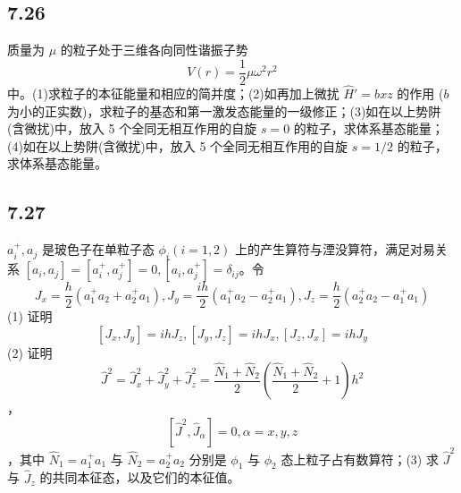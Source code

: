 \subsection{7.26}
质量为 $\mu$ 的粒子处于三维各向同性谐振子势 $$V(r) = \frac{1}{2} \mu \omega^2 r^2$$ 中。(1)求粒子的本征能量和相应的简并度；(2)如再加上微扰 $\hat{H}' = bxz$ 的作用 ($b$ 为小的正实数)，求粒子的基态和第一激发态能量的一级修正；(3)如在以上势阱(含微扰)中，放入 5 个全同无相互作用的自旋 $s = 0$ 的粒子，求体系基态能量；(4)如在以上势阱(含微扰)中，放入 5 个全同无相互作用的自旋 $s = 1/2$ 的粒子，求体系基态能量。

\subsection{7.27}
$a_i^+, a_j$ 是玻色子在单粒子态 $\phi_i (i = 1, 2)$ 上的产生算符与湮没算符，满足对易关系 $[a_i, a_j] = [a_i^+, a_j^+] = 0,  [a_i, a_j^+] = \delta_{ij}$。令 $$J_x = \frac{h}{2} (a_1^+ a_2 + a_2^+ a_1),  J_y = \frac{i h}{2} (a_1^+ a_2 - a_2^+ a_1),  J_z = \frac{h}{2} (a_2^+ a_2 - a_1^+ a_1)$$ (1) 证明 $$[J_x, J_y] = i h J_z,  [J_y, J_z] = i h J_x,  [J_z, J_x] = i h J_y$$ (2) 证明 $$\hat{J}^2 = \hat{J}_x^2 + \hat{J}_y^2 + \hat{J}_z^2 = \frac{\hat{N}_1 + \hat{N}_2}{2} \left( \frac{\hat{N}_1 + \hat{N}_2}{2} + 1 \right) h^2$$， $$[\hat{J}^2, \hat{J}_\alpha] = 0, \alpha = x,y,z$$，其中 $\hat{N}_1 = a_1^+ a_1$ 与 $\hat{N}_2 = a_2^+ a_2$ 分别是 $\phi_1$ 与 $\phi_2$ 态上粒子占有数算符；(3) 求 $\hat{J}^2$ 与 $\hat{J}_z$ 的共同本征态，以及它们的本征值。